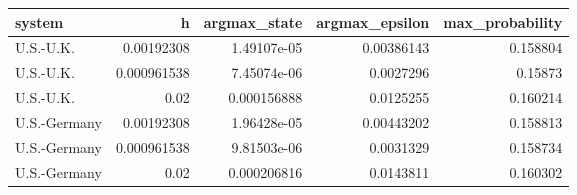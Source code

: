 \begin{tabular}{lrrrr}
\toprule
system & h & argmax_state & argmax_epsilon & max_probability \\
\midrule
U.S.-U.K. & 0.00192308 & 1.49107e-05 & 0.00386143 & 0.158804 \\
U.S.-U.K. & 0.000961538 & 7.45074e-06 & 0.0027296 & 0.15873 \\
U.S.-U.K. & 0.02 & 0.000156888 & 0.0125255 & 0.160214 \\
U.S.-Germany & 0.00192308 & 1.96428e-05 & 0.00443202 & 0.158813 \\
U.S.-Germany & 0.000961538 & 9.81503e-06 & 0.0031329 & 0.158734 \\
U.S.-Germany & 0.02 & 0.000206816 & 0.0143811 & 0.160302 \\
\bottomrule
\end{tabular}
